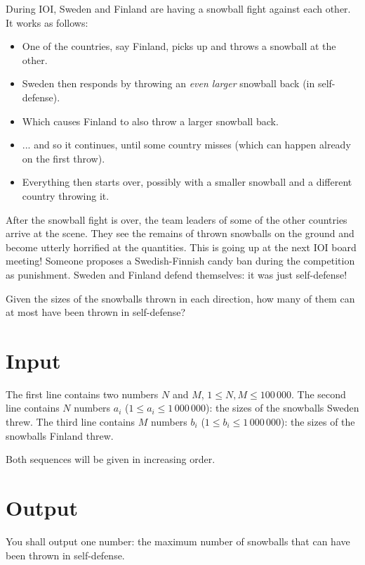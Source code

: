 
During IOI, Sweden and Finland are having a snowball fight against each other. It works as follows:

\begin{itemize}
  \item One of the countries, say Finland, picks up and throws a snowball at the other.
  \item Sweden then responds by throwing an \emph{even larger} snowball back (in self-defense).
  \item Which causes Finland to also throw a larger snowball back.
  \item ... and so it continues, until some country misses (which can happen already on the first throw).
  \item Everything then starts over, possibly with a smaller snowball and a different country throwing it.
\end{itemize}

After the snowball fight is over, the team leaders of some of the other countries arrive at the scene.
They see the remains of thrown snowballs on the ground and become utterly horrified at the quantities.
This is going up at the next IOI board meeting! Someone proposes a Swedish-Finnish candy ban during the competition as punishment.
Sweden and Finland defend themselves: it was just self-defense!

Given the sizes of the snowballs thrown in each direction, how many of them can at most have been thrown in self-defense?

\section*{Input}

The first line contains two numbers $N$ and $M$, $1 \le N,M \le 100\,000$.
The second line contains $N$ numbers $a_i$ ($1 \le a_i \le 1\,000\,000$): the sizes of the snowballs Sweden threw.
The third line contains $M$ numbers $b_i$ ($1 \le b_i \le 1\,000\,000$): the sizes of the snowballs Finland threw.

Both sequences will be given in increasing order.

\section*{Output}

You shall output one number: the maximum number of snowballs that can have been thrown in self-defense.

